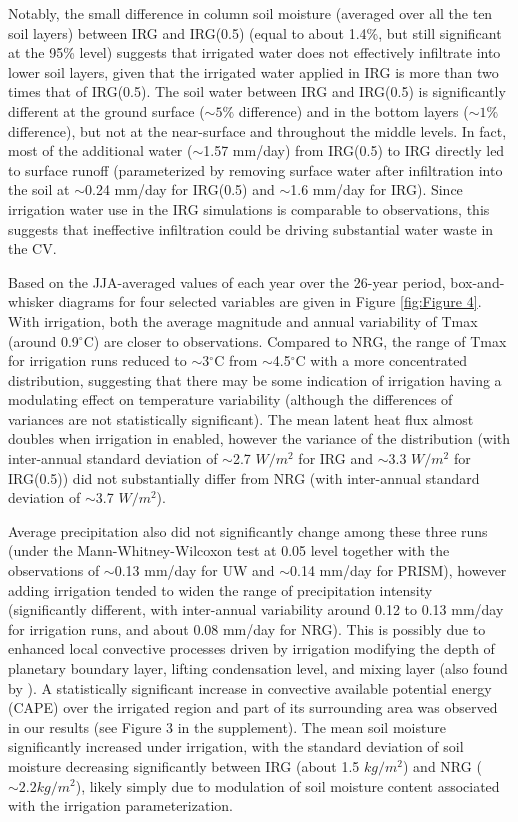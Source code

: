 Notably, the small difference in column soil moisture (averaged over all the ten soil layers) between IRG and IRG(0.5) (equal to about 1.4$\%$, but still significant at the 95\% level) suggests that irrigated water does not effectively infiltrate into lower soil layers, given that the irrigated water applied in IRG is more than two times that of IRG(0.5). The soil water between IRG and IRG(0.5) is significantly different at the ground surface ($\sim5\%$ difference) and in the bottom layers ($\sim1\%$ difference), but not at the near-surface and throughout the middle levels. In fact, most of the additional water ($\sim$1.57 mm/day) from IRG(0.5) to IRG directly led to surface runoff (parameterized by removing surface water after infiltration into the soil at $\sim$0.24 mm/day for IRG(0.5) and $\sim$1.6 mm/day for IRG). Since irrigation water use in the IRG simulations is comparable to observations, this suggests that ineffective infiltration could be driving substantial water waste in the CV.


Based on the JJA-averaged values of each year over the 26-year period, box-and-whisker diagrams for four selected variables are given in Figure \ref{fig:Figure 4}. With irrigation, both the average magnitude and annual variability of Tmax (around 0.9$^\circ$C) are closer to observations. Compared to NRG, the range of Tmax for irrigation runs reduced to $\sim$3$^\circ$C from $\sim$4.5$^\circ$C with a more concentrated distribution, suggesting that there may be some indication of irrigation having a modulating effect on temperature variability (although the differences of variances are not statistically significant). The mean latent heat flux almost doubles when irrigation in enabled, however the variance of the distribution (with inter-annual {standard deviation} of $\sim$2.7 $W/m^2$ for IRG and $\sim$3.3 $W/m^2$ for IRG(0.5)) did not substantially differ from NRG (with inter-annual {standard deviation} of $\sim$3.7 $W/m^2$). 

Average precipitation also did not significantly change among these three runs (under the Mann-Whitney-Wilcoxon test at 0.05 level together with the observations of $\sim$0.13 mm/day for UW and $\sim$0.14 mm/day for PRISM), however adding irrigation tended to widen the range of precipitation intensity (significantly different, with inter-annual variability around 0.12 to 0.13 mm/day for irrigation runs, and about 0.08 mm/day for NRG). This is possibly due to enhanced local convective processes driven by irrigation modifying the depth of planetary boundary layer, lifting condensation level, and mixing layer (also found by \cite{kawase2008impact, deangelis2010evidence, qian2013modeling}).  A statistically significant increase in convective available potential energy (CAPE) over the irrigated region and part of its surrounding area was observed in our results (see Figure 3 in the supplement). The mean soil moisture significantly increased under irrigation, with the {standard deviation} of soil moisture decreasing significantly between IRG (about 1.5 $kg/m^2$) and NRG ($\sim2.2 kg/m^2$), likely simply due to modulation of soil moisture content associated with the irrigation parameterization.

